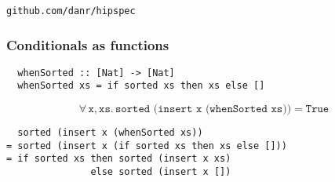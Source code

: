 \documentclass[serif,professionalfont]{beamer}
\newcommand\faa[2]{ \forall \, #1 , #2 . \,}
\newcommand\hs[1]{\texttt{#1}}
\newcommand\xs[0]{\hs{xs}}
\begin{document}
\begin{frame}
\frametitle{}
\begin{center}
\hs{github.com/danr/hipspec}
\end{center}
\end{frame}

\begin{frame}[fragile]
  \frametitle{Conditionals as functions}

  \sortedprop

\begin{verbatim}
  whenSorted :: [Nat] -> [Nat]
  whenSorted xs = if sorted xs then xs else []
\end{verbatim}

  \begin{equation*}
    \faa{\hs{x}}{\xs} \hs{sorted (insert x (whenSorted xs))} = \hs{True}
  \end{equation*}

\begin{verbatim}
  sorted (insert x (whenSorted xs))
= sorted (insert x (if sorted xs then xs else []))
= if sorted xs then sorted (insert x xs)
               else sorted (insert x [])
\end{verbatim}
\end{frame}
\end{document}
